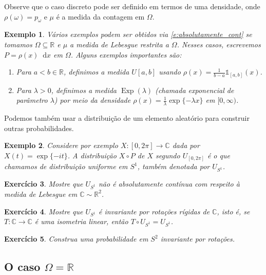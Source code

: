 \documentclass[reqno]{article}
\newcommand*\1{\mathds{1}}
\DeclareMathOperator{\Exp}{Exp}
\newtheorem{example}{Exemplo}[section]
\newtheorem{exercise}[example]{Exercício}
\renewcommand*\d{\mathop{}\!\mathrm{d}}
\begin{document}
Observe que o caso discreto pode ser definido em termos de uma densidade, onde $\rho(\omega) = p_\omega$ e $\mu$ é a medida da contagem em $\Omega$.

\begin{example}
  Vários exemplos podem ser obtidos via \eqref{e:absolutamente_cont} se tomamos $\Omega \subseteq \mathbb{R}$ e $\mu$ a medida de Lebesgue restrita a $\Omega$.
  Nesses casos, escrevemos $P = \rho(x) \d x$ em $\Omega$.
  Alguns exemplos importantes são:
  \begin{enumerate}
  \item Para $a < b \in \mathbb{R}$, definimos a medida $U[a,b]$ usando $\rho(x) = \tfrac{1}{b-a}\1_{[a,b]}(x)$.
  \item Para $\lambda > 0$, definimos a medida $\Exp(\lambda)$ (chamada exponencial de parâmetro $\lambda$) por meio da densidade $\rho(x) = \tfrac{1}{\lambda} \exp\{-\lambda x\}$ em $[0,\infty)$.
  \end{enumerate}
\end{example}

\newpage

Podemos também usar a distribuição de um elemento aleatório para construir outras probabilidades.

\begin{example}
  Considere por exemplo $X:[0,2\pi] \to \mathbb{C}$ dada por $X(t) = \exp\{-i t\}$.
  A distribuição $X \circ P$ de $X$ segundo $U_{[0,2\pi]}$ é o que chamamos de distribuição uniforme em $S^1$, também denotada por $U_{S^1}$.
\end{example}

\begin{exercise}
  Mostre que $U_{S^1}$ não é absolutamente contínua com respeito à medida de Lebesgue em $\mathbb{C} \sim \mathbb{R}^2$.
\end{exercise}

\begin{exercise}
  Mostre que $U_{S^1}$ é invariante por rotações rígidas de $\mathbb{C}$, isto é, se $T:\mathbb{C} \to \mathbb{C}$ é uma isometria linear, então $T \circ U_{S^1} = U_{S^1}$.
\end{exercise}

\begin{exercise}
  Construa uma probabilidade em $S^2$ invariante por rotações.
\end{exercise}

\subsection{O caso $\Omega = \mathbb{R}$}
\end{document}
